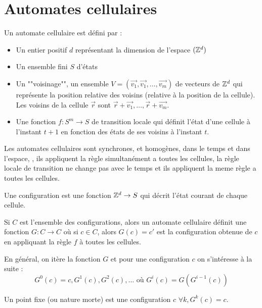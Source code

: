 \section{Automates cellulaires}

\begin{definition}
	Un automate cellulaire est défini par :
	\begin{itemize}
		\item Un entier positif $d$ représentant la dimension de l'espace $(\mathbb{Z}^d)$
		\item Un ensemble fini $S$ d'états
		\item Un ""voisinage"", \ie un ensemble $V = (\vec{v_1},  \vec{v_1}, \ldots ,\vec{v_m})$ de vecteurs de $\mathbb{Z}^d$
		      qui représente la position relative des voisins (relative à la position de la cellule). Les voisins de la
		      cellule $\vec r$ sont $\vec r + \vec {v_1},  \ldots , \vec r + \vec {v_m}$.
		\item Une fonction $f : S ^ m \to S$ de transition locale qui définit l'état d'une cellule à l'instant $t + 1$
		      en fonction des états de ses voisins à l'instant $t$.
	\end{itemize}
\end{definition}

Les automates cellulaires sont synchrones, et homogènes, dans le temps et dans l'espace, \ie,
ils appliquent la règle simultanément a toutes les cellules,
la règle locale de transition ne change pas avec le temps et
ils appliquent la meme règle a toutes les cellules.

\begin{definition}
	Une configuration est une fonction $\mathbb{Z} ^ d \to S$ qui décrit l'état courant de chaque cellule.

	Si $C$ est l'ensemble des configurations, alors un automate cellulaire définit une fonction $G: C \to C$ où si $c \in C$, alors
	$G(c) = c'$ est la configuration obtenue de $c$ en appliquant la règle $f$ à toutes les cellules.

	En général, on itère la fonction $G$ et pour une configuration $c$ on s'intéresse à la suite :
	$$ G^0 (c) = c, G^1 (c), G^2 (c), \ldots \text{ où } G^i (c) = G ( G^{i - 1 }(c))$$
\end{definition}

\begin{definition}
	Un point fixe (ou nature morte) est une configuration $c$ \tlq $\forall k, G^k(c) = c$.
\end{definition}

